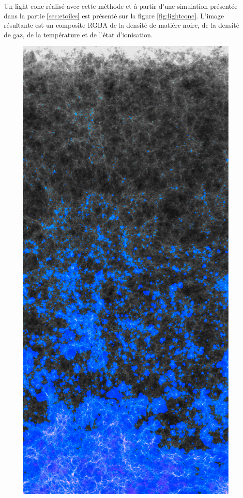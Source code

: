 Un light cone réalisé avec cette méthode et à partir d'une simulation présentée dans la partie \ref{sec:etoiles} est présenté sur la figure \ref{fig:lightcone}.
L'image résultante est un composite RGBA de la densité de matière noire, de la densité de gaz, de la température et de l'état d'ionisation.

\begin{figure}
	\centering
        \includegraphics[height=.95\textheight]{img/04/frise_wall2.png} 

\end{figure}
